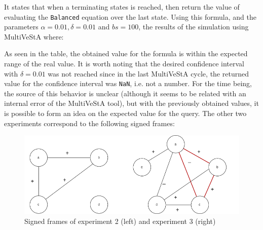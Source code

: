 It states that when a terminating states is reached, then return the value of evaluating the \texttt{Balanced} equation over the last state. Using this formula, and the parameters $\alpha = 0.01, \delta = 0.01$ and $bs = 100$, the results of the simulation using MultiVeStA where:

\begin{table}[H]
\centering
{}
\end{table}

As seen in the table, the obtained value for the formula is within the expected range of the real value. It is worth noting that the desired confidence interval with $\delta = 0.01$ was not reached since in the last MultiVeStA cycle, the returned value for the confidence interval was \texttt{NaN}, i.e. not a number. For the time being, the source of this behavior is unclear (although it seems to be related with an internal error of the MultiVeStA tool), but with the previously obtained values, it is possible to form an idea on the expected value for the query. The other two experiments correspond to the following signed frames:

\begin{figure}[H]
    \centering
    \includegraphics[scale = 0.5]{images/CS14.png}
    \caption{Signed frames of experiment 2 (left) and experiment 3 (right)}
    \label{fig:CS14}
\end{figure}

